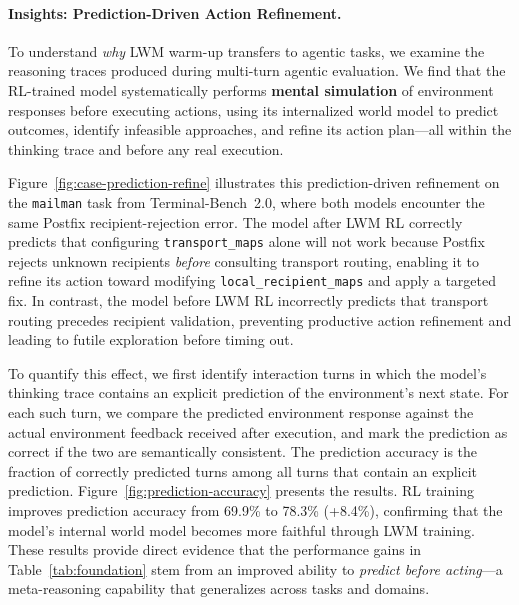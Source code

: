 \paragraph{Insights: Prediction-Driven Action Refinement.}
To understand \emph{why} LWM warm-up transfers to agentic tasks, we examine the reasoning traces produced during multi-turn agentic evaluation.
We find that the RL-trained model systematically performs \textbf{mental simulation} of environment responses before executing actions, using its internalized world model to predict outcomes, identify infeasible approaches, and refine its action plan---all within the thinking trace and before any real execution.

Figure~\ref{fig:case-prediction-refine} illustrates this prediction-driven refinement on the \texttt{mailman} task from Terminal-Bench~2.0, where both models encounter the same Postfix recipient-rejection error.
The model after LWM RL correctly predicts that configuring \texttt{transport\_maps} alone will not work because Postfix rejects unknown recipients \emph{before} consulting transport routing, enabling it to refine its action toward modifying \texttt{local\_recipient\_maps} and apply a targeted fix.
In contrast, the model before LWM RL incorrectly predicts that transport routing precedes recipient validation, preventing productive action refinement and leading to futile exploration before timing out.

To quantify this effect, we first identify interaction turns in which the model's thinking trace contains an explicit prediction of the environment's next state.
For each such turn, we compare the predicted environment response against the actual environment feedback received after execution, and mark the prediction as correct if the two are semantically consistent.
The prediction accuracy is the fraction of correctly predicted turns among all turns that contain an explicit prediction.
Figure~\ref{fig:prediction-accuracy} presents the results.
RL training improves prediction accuracy from 69.9\% to 78.3\% (+8.4\%), confirming that the model's internal world model becomes more faithful through LWM training.
These results provide direct evidence that the performance gains in Table~\ref{tab:foundation} stem from an improved ability to \emph{predict before acting}---a meta-reasoning capability that generalizes across tasks and domains.



